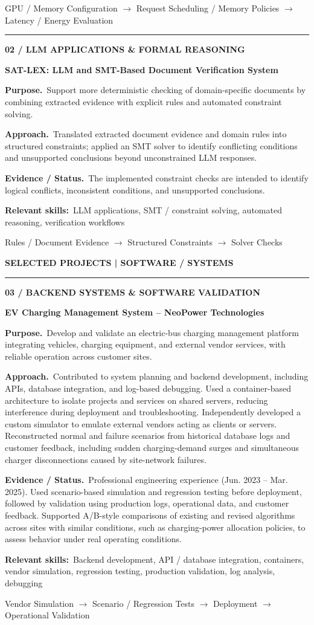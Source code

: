 \documentclass[a4paper,11pt]{article}
\newcommand{\smallhead}[1]{{\footnotesize\bfseries\color{muted} #1}\par\vspace{4pt}\color{rulecol}\rule{\linewidth}{0.8pt}\color{ink}\vspace{12pt}}
\newcommand{\project}[6]{%
{\small\color{muted}\bfseries #1}\par\vspace{3pt}
{\fontsize{12}{14}\selectfont\bfseries #2}\par\vspace{8pt}
{\small\textbf{Purpose.}\ #3}\par\vspace{6pt}
{\small\textbf{Approach.}\ #4}\par\vspace{6pt}
{\small\textbf{Evidence / Status.}\ #5}\par\vspace{6pt}
{\footnotesize\textbf{Relevant skills:}\ #6}\par\vspace{10pt}}
\newcommand{\flowline}[1]{\noindent\colorbox{shade}{\parbox{\dimexpr\linewidth-2\fboxsep}{\centering\footnotesize\color{muted} #1}}\par\vspace{18pt}}
\newcommand{\separate}{\par\noindent\color{rulecol}\rule{\linewidth}{0.7pt}\color{ink}\par\vspace{13pt}}
\begin{document}
\flowline{
GPU / Memory Configuration
$\longrightarrow$ Request Scheduling / Memory Policies
$\longrightarrow$ Latency / Energy Evaluation
}
\separate
\project{02 \quad / \quad LLM APPLICATIONS \& FORMAL REASONING}
{SAT-LEX: LLM and SMT-Based Document Verification System}
{Support more deterministic checking of domain-specific documents by combining extracted evidence with explicit rules and automated constraint solving.}
{Translated extracted document evidence and domain rules into structured constraints; applied an SMT solver to identify conflicting conditions and unsupported conclusions beyond unconstrained LLM responses.}
{The implemented constraint checks are intended to identify logical conflicts, inconsistent conditions, and unsupported conclusions.}
{LLM applications, SMT / constraint solving, automated reasoning, verification workflows}
\flowline{Rules / Document Evidence $\longrightarrow$ Structured Constraints $\longrightarrow$ Solver Checks}
\newpage
\smallhead{SELECTED PROJECTS \quad | \quad SOFTWARE / SYSTEMS}
\project{03 \quad / \quad BACKEND SYSTEMS \& SOFTWARE VALIDATION}
{EV Charging Management System -- NeoPower Technologies}
{Develop and validate an electric-bus charging management platform integrating vehicles, charging equipment, and external vendor services, with reliable operation across customer sites.}
{Contributed to system planning and backend development, including APIs, database integration, and log-based debugging. Used a container-based architecture to isolate projects and services on shared servers, reducing interference during deployment and troubleshooting. Independently developed a custom simulator to emulate external vendors acting as clients or servers. Reconstructed normal and failure scenarios from historical database logs and customer feedback, including sudden charging-demand surges and simultaneous charger disconnections caused by site-network failures.}
{Professional engineering experience (Jun. 2023 -- Mar. 2025). Used scenario-based simulation and regression testing before deployment, followed by validation using production logs, operational data, and customer feedback. Supported A/B-style comparisons of existing and revised algorithms across sites with similar conditions, such as charging-power allocation policies, to assess behavior under real operating conditions.}
{Backend development, API / database integration, containers, vendor simulation, regression testing, production validation, log analysis, debugging}
\flowline{Vendor Simulation $\longrightarrow$ Scenario / Regression Tests $\longrightarrow$ Deployment $\longrightarrow$ Operational Validation}
\end{document}
